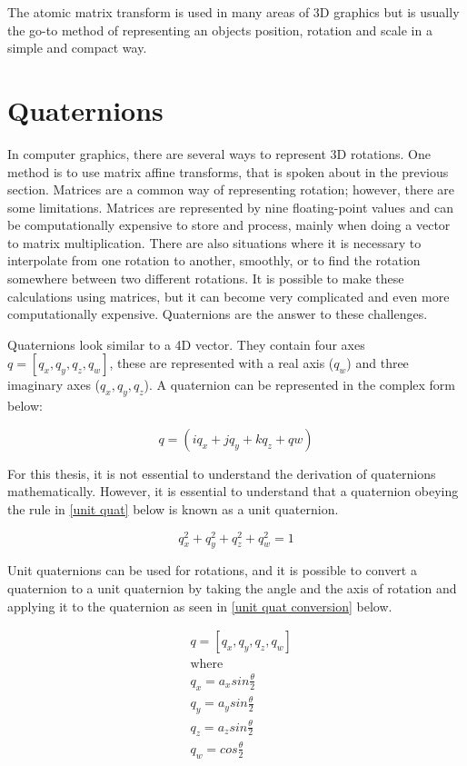 The atomic matrix transform is used in many areas of 3D graphics but is usually the go-to method of representing an objects position, rotation and scale in a simple and compact way. 

\section{Quaternions}

In computer graphics, there are several ways to represent 3D rotations. One method is to use matrix affine transforms, that is spoken about in the previous section. Matrices are a common way of representing rotation; however, there are some limitations. Matrices are represented by nine floating-point values and can be computationally expensive to store and process, mainly when doing a vector to matrix multiplication. There are also situations where it is necessary to interpolate from one rotation to another, smoothly, or to find the rotation somewhere between two different rotations. It is possible to make these calculations using matrices, but it can become very complicated and even more computationally expensive. Quaternions are the answer to these challenges.

Quaternions look similar to a 4D vector. They contain four axes $q = [q_x, q_y, q_z, q_w]$, these are represented with a real axis ($q_w$) and three imaginary axes ($q_x, q_y, q_z$). A quaternion can be represented in the complex form below: 

\begin{equation}
q = (iq_x + jq_y + kq_z + qw)
\end{equation}

\noindent
For this thesis, it is not essential to understand the derivation of quaternions mathematically. However, it is essential to understand that a quaternion obeying the rule in \ref{unit quat} below is known as a unit quaternion.

\begin{equation} \label{unit quat}
	q_x^2 + q_y^2 + q_z^2 + q_w^2 = 1
\end{equation}

\noindent
Unit quaternions can be used for rotations, and it is possible to convert a quaternion to a unit quaternion by taking the angle and the axis of rotation and applying it to the quaternion as seen in \ref{unit quat conversion} below.

\begin{equation} \label{unit quat conversion}
\begin{aligned}
& q = [q_x, q_y, q_z, q_w]\\
& \text{where} \\
& q_x = a_x sin \frac{\theta}{2}\\
& q_y = a_y sin \frac{\theta}{2}\\
& q_z = a_z sin \frac{\theta}{2}\\
& q_w = cos \frac{\theta}{2}
\end{aligned}
\end{equation}

